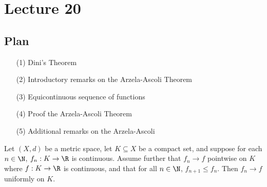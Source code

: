 \section{Lecture 20}

\subsection{Plan}

\begin{enumerate}
    \item[(1)] Dini's Theorem
    \item[(2)] Introductory remarks on the Arzela-Ascoli Theorem
    \item[(3)] Equicontinuous sequence of functions
    \item[(4)] Proof the Arzela-Ascoli Theorem
    \item[(5)] Additional remarks on the Arzela-Ascoli
\end{enumerate}

\begin{theorem}[Rudin 7.13]
    Let \( (X,d) \) be a metric space, let \( K \subseteq  X   \) be a compact set, and suppose for each \( n \in \N  \), \( {f}_{n} : K \to \R  \) is continuous. Assume further that \( {f}_{n} \to f  \) pointwise on \( K  \) where \( f : K \to \R  \) is continuous, and that for all \( n \in \N  \), \( {f}_{n+1} \leq {f}_{n} \). Then \( {f}_{n} \to f  \) uniformly on \( K  \). 
\end{theorem}

